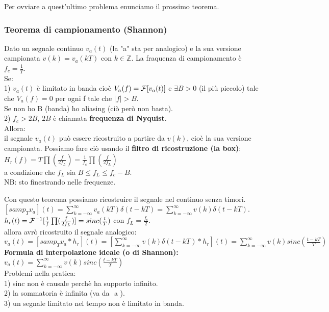 	
	Per ovviare a quest'ultimo problema enunciamo il prossimo teorema.
	
	\subsubsection{Teorema di campionamento (Shannon)}
	
	Dato un segnale continuo $ v_a(t)$ (la "a" sta per analogico) e la sua versione campionata $ v(k) = v_a(kT)$ con $ k \in \mathbb{Z} $. La fraquenza di campionamento è $ f_c= \frac{1}{T} $.\\
	Se:\\
	1) $ v_a(t) $ è limitato in banda cioè $ V_a(f) = \mathcal{F} [v_a(t)]$ e $ \exists B>0 $ (il più piccolo) tale che $ V_a(f) =0 $ per ogni f tale che $ |f|>B$.\\
	Se non ho B (banda) ho aliasing (ciò però non basta).\\
	2) $ f_c > 2B $, $ 2B $ è chiamata \textbf{frequenza di Nyquist}.\\
	Allora:\\
	il segnale $ v_a(t) $ può essere ricostruito a partire da $ v(k) $, cioè la sua versione campionata. Possiamo fare ciò usando il \textbf{filtro di ricostruzione (la box)}:\\
	$ H_r(f) = T \prod (\frac{f}{2 f_L}) = \frac{1}{f_c} \prod (\frac{f}{2 f_L})$\\
	a condizione che $ f_L $ sia $ B \leq f_L \leq f_c - B$.\\
	NB: sto finestrando nelle frequenze.
	
	
	Con questo teorema possiamo ricostruire il segnale nel continuo senza timori.\\
		$ [samp_T v_a](t)
		= \sum_{k= -\infty}^{\infty} v_a(kT) \delta(t-kT)
		= \sum_{k= -\infty}^{\infty} v(k) \delta(t-kT) $.\\
		$ h_r(t)
		= \mathcal{F}^{-1} [\frac{1}{f} \prod (\frac{f}{2 f_L})]
		= sinc(\frac{t}{T})$
	 con $ f_L = \frac{f_c}{2}$.\\
	allora avrò ricostruito il segnale analogico:\\
		$ v_a(t)
		= [samp_T v_a * h_r] (t)
		= [ \sum_{k= -\infty}^{\infty} v(k) \delta(t-kT) * h_r](t)
		= \sum_{k= -\infty}^{\infty} v(k) sinc(\frac{t-kT}{T})$\\
	
	\textbf{Formula di interpolazione ideale (o di Shannon):}
	$ v_a(t) = \sum_{k= -\infty}^{\infty} v(k) sinc(\frac{t-kT}{T})$\\
	
	Problemi nella pratica:\\
	1) sinc non è causale perchè ha supporto infinito.\\
	2) la sommatoria è infinita (va da $ $ a $ $).\\
	3) un segnale limitato nel tempo non è limitato in banda.\\
	
